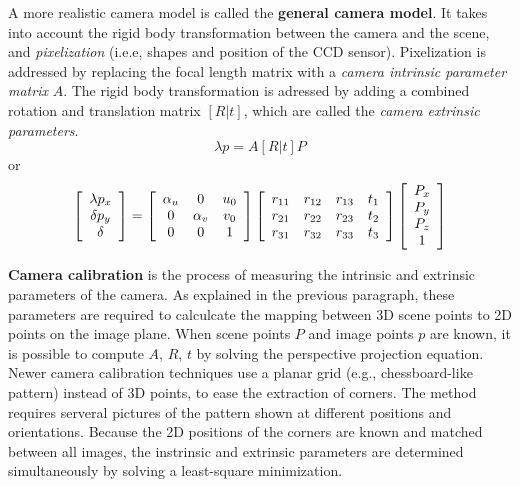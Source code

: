 A more realistic camera model is called the \textbf{general camera model}.
It takes into account the rigid body transformation between the camera and the scene, and \textit{pixelization} (i.e.e, shapes and position of the CCD sensor).
Pixelization is addressed by replacing the focal length matrix with a \textit{camera intrinsic parameter matrix} $A$.
The rigid body transformation is adressed by adding a combined rotation and translation matrix $[R|t]$, which are called the \textit{camera extrinsic parameters}.
\begin{equation}
\lambda p = A [ R | t] P
\end{equation}
or
\begin{equation}
\left[ \begin{array}{c}
\lambda p_x \\
\delta p_y \\
\delta
\end{array} \right]
=
\left[ \begin{array}{c c c}
\alpha_u & 0 & u_0 \\
0 & \alpha_v & v_0 \\
0 & 0 & 1
\end{array} \right]
\left[ \begin{array}{c c c c}
r_{11} & r_{12} & r_{13} & t_1 \\
r_{21} & r_{22} & r_{23} & t_2 \\
r_{31} & r_{32} & r_{33} & t_3
\end{array} \right]
\left[ \begin{array}{c}
P_x \\
P_y \\
P_z \\
1
\end{array} \right]
\end{equation}

\textbf{Camera calibration} is the process of measuring the intrinsic and extrinsic parameters of the camera.
As explained in the previous paragraph, these parameters are required to calculcate the mapping between 3D scene points to 2D points on the image plane.
When scene points $P$ and image points $p$ are known, it is possible to compute $A$, $R$, $t$ by solving the perspective projection equation.
Newer camera calibration techniques use a planar grid (e.g., chessboard-like pattern) instead of 3D points, to ease the extraction of corners.
The method requires serveral pictures of the pattern shown at different positions and orientations.
Because the 2D positions of the corners are known and matched between all images, the instrinsic and extrinsic parameters are determined simultaneously by solving a least-square minimization.

